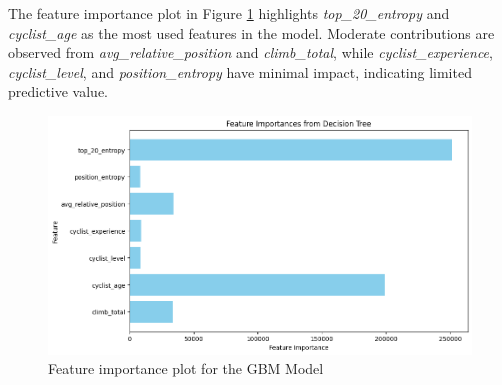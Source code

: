\noindent The feature importance plot in Figure \ref{fig:gbm-feat-importance} highlights \textit{top\_20\_entropy} and \textit{cyclist\_age} as the most used features in the model. Moderate contributions are observed from \textit{avg\_relative\_position} and \textit{climb\_total}, while \textit{cyclist\_experience}, \textit{cyclist\_level}, and \textit{position\_entropy} have minimal impact, indicating limited predictive value.

\begin{figure}[H]
    \centering
    \includegraphics[width=0.4\linewidth]{images/CLASSIFICATION/gmb_feat_import.png}
    \caption{\small Feature importance plot for the GBM Model}
    \label{fig:gbm-feat-importance}
\end{figure}